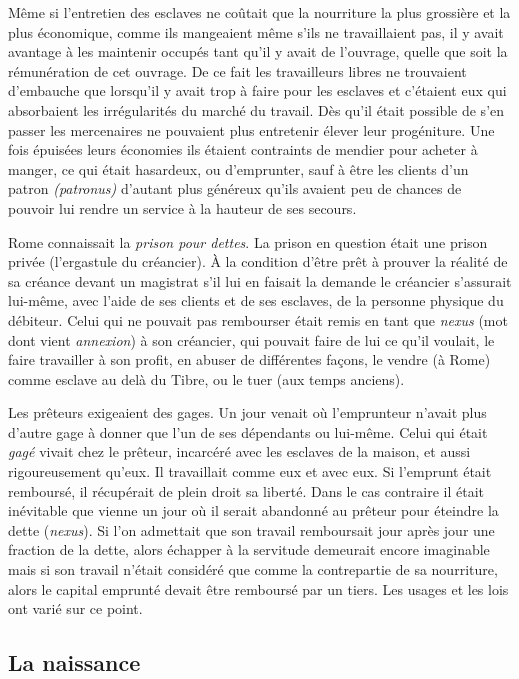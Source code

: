 Même si l'entretien des esclaves ne coûtait que la nourriture la
plus grossière et la plus économique, comme ils mangeaient même s'ils
ne travaillaient pas, il y avait avantage à les maintenir occupés tant qu'il y
avait de l'ouvrage, quelle que soit la rémunération de cet ouvrage. De ce
fait les travailleurs libres ne trouvaient d'embauche que lorsqu'il y avait
trop à faire pour les esclaves et c'étaient eux qui absorbaient les irrégularités
du marché du travail. Dès qu'il était possible de s'en passer les mercenaires
ne pouvaient plus entretenir élever leur progéniture. Une fois
épuisées leurs économies ils étaient contraints de mendier pour acheter à
manger, ce qui était hasardeux, ou d'emprunter, sauf à être les clients
d'un patron \emph{(patronus)} d'autant plus généreux qu'ils avaient peu de chances
de pouvoir lui rendre un service à la hauteur de ses secours.

Rome connaissait la \emph{prison pour dettes}. La prison en question était
une prison privée (l'ergastule du créancier). À la condition d'être prêt à
prouver la réalité de sa créance devant un magistrat s'il lui en faisait la
demande le créancier s'assurait lui-même, avec l'aide de ses clients et de
ses esclaves, de la personne physique du débiteur. Celui qui ne pouvait
pas rembourser était remis en tant que \emph{nexus} (mot dont vient {\emph{annexion}})
à son créancier, qui pouvait faire de lui ce qu'il voulait, le faire travailler à
son profit, en abuser de différentes façons, le vendre (à Rome) comme
esclave au delà du Tibre, ou le tuer (aux temps anciens).

Les prêteurs exigeaient des gages. Un jour venait où l'emprunteur
n'avait plus d'autre gage à donner que l'un de ses dépendants ou lui-même.
Celui qui était \emph{gagé} vivait chez le prêteur, incarcéré avec les esclaves
de la maison, et aussi rigoureusement qu'eux. Il travaillait comme eux
et avec eux. Si l'emprunt était remboursé, il récupérait de plein droit sa
liberté. Dans le cas contraire il était inévitable que vienne un jour où il
serait abandonné au prêteur pour éteindre la dette (\emph{nexus}). Si l'on admettait
que son travail remboursait jour après jour une fraction de la dette,
alors échapper à la servitude demeurait encore imaginable mais si son
travail n'était considéré que comme la contrepartie de sa nourriture, alors
le capital emprunté devait être remboursé par un tiers. Les usages et les
lois ont varié sur ce point.

\subsection{La naissance}

